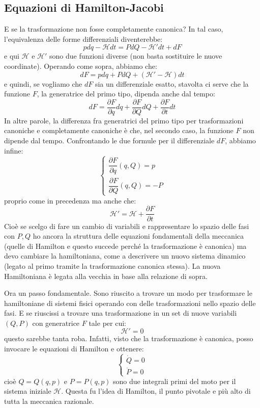 \documentclass[a4paper,openany]{article}
\begin{document}
	\subsection{Equazioni di Hamilton-Jacobi}
	E se la trasformazione non fosse completamente canonica? In tal caso, l'equivalenza delle forme differenziali diventerebbe:
	\begin{equation}\label{key}
		pdq-\mathcal{H}dt = PdQ-\mathcal{H}'dt+dF
	\end{equation}
	e qui $\mathcal{H} \mbox{ e } \mathcal{H}'$ sono due funzioni diverse (non basta sostituire le nuove coordinate). Operando come sopra, abbiamo che:
	$$
	dF = pdq + PdQ + (\mathcal{H}'-\mathcal{H})dt
	$$
	e quindi, se vogliamo che $dF$ sia un differenziale esatto, stavolta ci serve che la funzione $F$, la generatrice del primo tipo, dipenda anche dal tempo:
	$$
	dF = \dfrac{\partial F}{\partial q}dq+\dfrac{\partial F}{\partial Q}dQ + \dfrac{\partial F}{\partial t}dt
	$$
	In altre parole, la differenza fra generatrici del primo tipo per trasformazioni canoniche e completamente canoniche è che, nel secondo caso, la funzione $F$ non dipende dal tempo. Confrontando le due formule per il differenziale $dF$, abbiamo infine:
	\begin{equation}
		\begin{cases}
			\dfrac{\partial F}{\partial q}(q,Q)=p \\[8pt]
			\dfrac{\partial F}{\partial Q}(q,Q) = -P
		\end{cases}
	\end{equation}
	proprio come in precedenza ma anche che:
	\begin{equation}
		\mathcal{H}' = \mathcal{H}  + \dfrac{\partial F}{\partial t}
	\end{equation}
	Cioè se scelgo di fare un cambio di variabili e rappresentare lo spazio delle fasi con $P,Q$ ho ancora la struttura delle equazioni fondamentali della meccanica (quelle di Hamilton e questo succede perché la trasformazione è canonica) ma devo cambiare la hamiltoniana, come a descrivere un nuovo sistema dinamico (legato al primo tramite la trasformazione canonica stessa). La nuova Hamiltoniana è legata alla vecchia in base alla relazione di sopra.
	
	Ora un passo fondamentale. Sono riuscito a trovare un modo per trasformare le hamiltoniane di sistemi fisici operando con delle trasformazioni nello spazio delle fasi. E se riuscissi a trovare una trasformazione in un set di nuove variabili $(Q,P)$ con generatrice $F$ tale per cui:
	\begin{equation}\label{key}
		\mathcal{H}' = 0
	\end{equation}
	questo sarebbe tanta roba. Infatti, visto che la trasformazione è canonica, posso invocare le equazioni di Hamilton e ottenere:
	\begin{equation}\label{key}
		\begin{cases}
			\dot{Q} = 0 \\
			\dot{P} =0
		\end{cases}
	\end{equation}
	cioè $Q = Q(q,p)$ e $P=P(q,p)$ sono due integrali primi del moto per il sistema iniziale $\mathcal{H}$. Questa fu l'idea di Hamilton, il punto pivotale e più alto di tutta la meccanica razionale.
	
\end{document}
